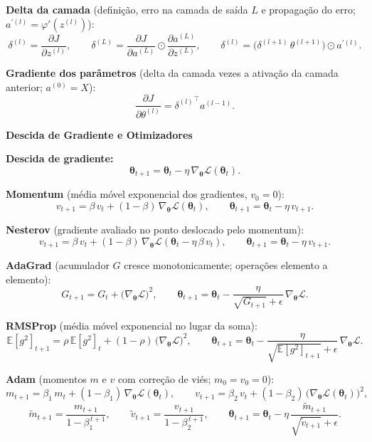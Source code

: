 \documentclass[11pt,a4paper]{article}
\newcommand{\thetav}{\boldsymbol{\theta}}
\newcommand{\bloco}[1]{%
  \par\vspace{0.3em}%
  {\bfseries\large #1}\par%
  \vspace{-0.4em}{\color{gray!60}\rule{\linewidth}{0.4pt}}\par%
}
\begin{document}
\textbf{Delta da camada} (definição, erro na camada de saída $L$ e propagação do erro; $a^{\prime(l)} = \varphi'(z^{(l)})$):
\[
  \delta^{(l)} = \frac{\partial J}{\partial z^{(l)}},
  \qquad
  \delta^{(L)} = \frac{\partial J}{\partial a^{(L)}} \odot \frac{\partial a^{(L)}}{\partial z^{(L)}},
  \qquad
  \delta^{(l)} = \bigl(\delta^{(l+1)}\,\theta^{(l+1)}\bigr) \odot a^{\prime(l)}.
\]

\textbf{Gradiente dos parâmetros} (delta da camada vezes a ativação da camada anterior; $a^{(0)} = X$):
\[
  \frac{\partial J}{\partial\theta^{(l)}} = {\delta^{(l)}}^{\top} a^{(l-1)}.
\]

\bloco{Descida de Gradiente e Otimizadores}

\textbf{Descida de gradiente:}
\[
  \thetav_{t+1} = \thetav_{t} - \eta\,\nabla_{\thetav}\mathcal{L}(\thetav_{t}).
\]

\textbf{Momentum} (média móvel exponencial dos gradientes, $v_0 = 0$):
\[
  v_{t+1} = \beta\,v_{t} + (1-\beta)\,\nabla_{\thetav}\mathcal{L}(\thetav_{t}),
  \qquad
  \thetav_{t+1} = \thetav_{t} - \eta\,v_{t+1}.
\]

\textbf{Nesterov} (gradiente avaliado no ponto deslocado pelo momentum):
\[
  v_{t+1} = \beta\,v_{t} + (1-\beta)\,\nabla_{\thetav}\mathcal{L}(\thetav_{t} - \eta\,\beta\,v_{t}),
  \qquad
  \thetav_{t+1} = \thetav_{t} - \eta\,v_{t+1}.
\]

\textbf{AdaGrad} (acumulador $G$ cresce monotonicamente; operações elemento a elemento):
\[
  G_{t+1} = G_{t} + \bigl(\nabla_{\thetav}\mathcal{L}\bigr)^{2},
  \qquad
  \thetav_{t+1} = \thetav_{t} - \frac{\eta}{\sqrt{G_{t+1}} + \epsilon}\,\nabla_{\thetav}\mathcal{L}.
\]

\textbf{RMSProp} (média móvel exponencial no lugar da soma):
\[
  \mathbb{E}[g^{2}]_{t+1} = \rho\,\mathbb{E}[g^{2}]_{t} + (1-\rho)\,\bigl(\nabla_{\thetav}\mathcal{L}\bigr)^{2},
  \qquad
  \thetav_{t+1} = \thetav_{t} - \frac{\eta}{\sqrt{\mathbb{E}[g^{2}]_{t+1}} + \epsilon}\,\nabla_{\thetav}\mathcal{L}.
\]

\textbf{Adam} (momentos $m$ e $v$ com correção de viés; $m_0 = v_0 = 0$):
\[
  m_{t+1} = \beta_1\,m_{t} + (1-\beta_1)\,\nabla_{\thetav}\mathcal{L}(\thetav_{t}),
  \qquad
  v_{t+1} = \beta_2\,v_{t} + (1-\beta_2)\,\bigl(\nabla_{\thetav}\mathcal{L}(\thetav_{t})\bigr)^{2},
\]
\[
  \widetilde{m}_{t+1} = \frac{m_{t+1}}{1 - \beta_1^{\,t+1}},
  \qquad
  \widetilde{v}_{t+1} = \frac{v_{t+1}}{1 - \beta_2^{\,t+1}},
  \qquad
  \thetav_{t+1} = \thetav_{t} - \eta\,\frac{\widetilde{m}_{t+1}}{\sqrt{\widetilde{v}_{t+1}} + \epsilon}.
\]
\end{document}
